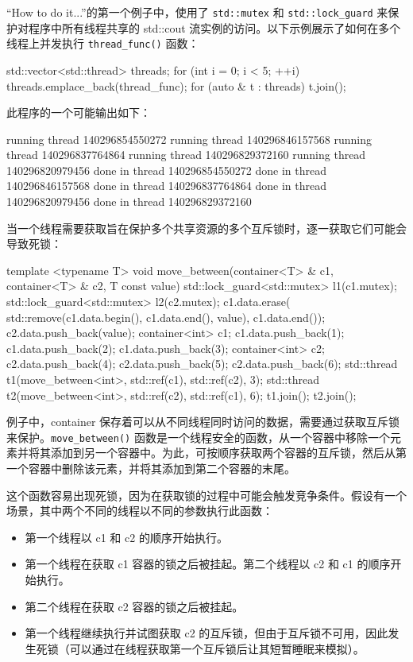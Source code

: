 “How to do it...”的第一个例子中，使用了 \verb|std::mutex| 和 \verb|std::lock_guard| 来保护对程序中所有线程共享的 std::cout 流实例的访问。以下示例展示了如何在多个线程上并发执行 \verb|thread_func()| 函数：

\begin{cpp}
std::vector<std::thread> threads;
for (int i = 0; i < 5; ++i)
    threads.emplace_back(thread_func);
for (auto & t : threads)
    t.join();
\end{cpp}

此程序的一个可能输出如下：

\begin{shell}
running thread 140296854550272
running thread 140296846157568
running thread 140296837764864
running thread 140296829372160
running thread 140296820979456
done in thread 140296854550272
done in thread 140296846157568
done in thread 140296837764864
done in thread 140296820979456
done in thread 140296829372160
\end{shell}

当一个线程需要获取旨在保护多个共享资源的多个互斥锁时，逐一获取它们可能会导致死锁：

\begin{cpp}
template <typename T>
void move_between(container<T> & c1, container<T> & c2, T const value)
{
    std::lock_guard<std::mutex> l1(c1.mutex);
    std::lock_guard<std::mutex> l2(c2.mutex);
    c1.data.erase(
        std::remove(c1.data.begin(), c1.data.end(), value),
        c1.data.end());
    c2.data.push_back(value);
}
container<int> c1;
c1.data.push_back(1);
c1.data.push_back(2);
c1.data.push_back(3);
container<int> c2;
c2.data.push_back(4);
c2.data.push_back(5);
c2.data.push_back(6);
std::thread t1(move_between<int>, std::ref(c1), std::ref(c2), 3);
std::thread t2(move_between<int>, std::ref(c2), std::ref(c1), 6);
t1.join();
t2.join();
\end{cpp}

例子中，container 保存着可以从不同线程同时访问的数据，需要通过获取互斥锁来保护。\verb|move_between()| 函数是一个线程安全的函数，从一个容器中移除一个元素并将其添加到另一个容器中。为此，可按顺序获取两个容器的互斥锁，然后从第一个容器中删除该元素，并将其添加到第二个容器的末尾。

这个函数容易出现死锁，因为在获取锁的过程中可能会触发竞争条件。假设有一个场景，其中两个不同的线程以不同的参数执行此函数：

\begin{itemize}
\item
第一个线程以 c1 和 c2 的顺序开始执行。

\item
第一个线程在获取 c1 容器的锁之后被挂起。第二个线程以 c2 和 c1 的顺序开始执行。

\item
第二个线程在获取 c2 容器的锁之后被挂起。

\item
第一个线程继续执行并试图获取 c2 的互斥锁，但由于互斥锁不可用，因此发生死锁（可以通过在线程获取第一个互斥锁后让其短暂睡眠来模拟）。
\end{itemize}

